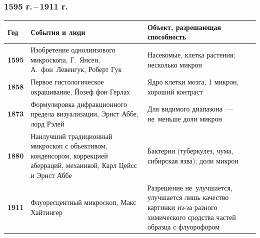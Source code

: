 \documentclass[9pt, compress, xcolor=table]{beamer}
\begin{document}
\begin{frame}[fragile]
  \frametitle{1595 г.\,--\,1911 г.}
  
\begin{table}[htbp]
\begin{center}
\small
\arrayrulewidth=1pt
\begin{tabular}{|l|p{}|p{}|}
\hline
\cellcolor{gray!25}\textbf{Год} & 
\cellcolor{gray!25}\textbf{События и люди} & 
\cellcolor{gray!25}\textbf{Объект, разрешающая способность} \\ \hline
\textbf{1595} & 
Изобретение однолинзового микроскопа, Г.~Янсен, А.~фон~Левенгук, Роберт Гук & 
Насекомые, клетка растения; несколько микрон \\ \hline
\textbf{1858} & 
Первое гистологическое окрашивание, Йозеф фон Герлах & 
Ядро клетки мозга, 1 микрон, хороший контраст \\ \hline
 \textbf{1873} & 
Формулировка дифракционного предела визуализации, Эрнст Аббе, лорд Рэлей & Для видимого диапазона~--- не~меньше доли микрон \\ \hline
\textbf{1880} & 
Наилучший традиционный микроскоп с объективом, конденсором, коррекцией аберраций, механикой, Карл Цейсс и Эрнст Аббе & 
Бактерии (туберкулез, чума, сибирская язва); доли микрон \\ \hline
\textbf{1911} & 
Флуоресцентный микроскоп, Макс Хайтингер & 
Разрешение не~улучшается, улучшается лишь качество картинки из-за разного химического сродства частей образца с флуорофором \\ \hline
\end{tabular}\label{tab1}
\end{center}
\end{table}

\end{frame}
\end{document}
